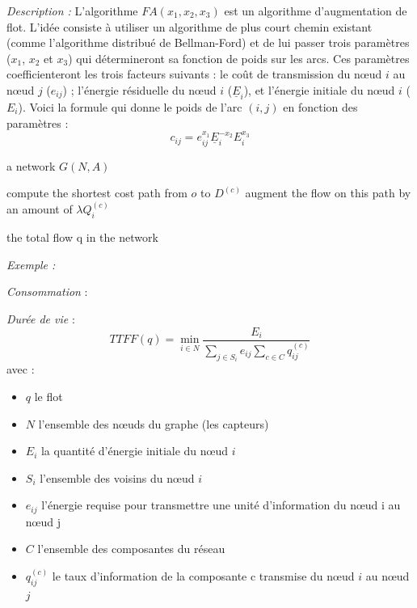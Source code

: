 \emph{Description :}
L'algorithme $FA(x_1, x_2, x_3)$ est un algorithme d'augmentation de flot. L'idée consiste à utiliser un algorithme de plus court chemin existant (comme l'algorithme distribué de Bellman-Ford) et de lui passer trois paramètres ($x_1$, $x_2$ et $x_3$) qui détermineront sa fonction de poids sur les arcs. Ces paramètres coefficienteront les trois facteurs suivants : le coût de transmission du nœud $i$ au nœud $j$ ($e_{ij}$) ; l'énergie résiduelle du nœud $i$ ($\underline{E}_i$), et l'énergie initiale du nœud $i$ ($E_i$). Voici la formule qui donne le poids de l'arc $(i,j)$ en fonction des paramètres :
\begin{displaymath}
c_{ij} = e_{ij}^{x_1} \underline{E}_i^{-x_2} E_i^{x_3}
\end{displaymath}

\begin{algorithm}[H]
\caption{$FA(x_1,x_2,x_3)$}
\label{algo_FA}
\begin{algorithmic}
\REQUIRE a network $ G(N,A) $

			\STATE compute the shortest cost path from $o$ to $D^{(c)}$
			\STATE augment the flow on this path by an amount of $\lambda Q_i^{(c)}$
		\ENDFOR
	\ENDFOR
\ENDWHILE

\RETURN the total flow q in the network
\end{algorithmic}
\end{algorithm}

\emph{Exemple :} %

\emph{Consommation} : 

\emph{Durée de vie} :  $$TTFF(q) = \min\limits_{i \in N}\frac{E_i}{\sum \limits_{j \in S_i} {e_{ij}} \sum \limits_{c \in C} {q_{ij}^{(c)}}}$$
avec :
\begin{itemize}
\item $q$ le flot
\item $N$ l'ensemble des nœuds du graphe (les capteurs)
\item $E_i$ la quantité d'énergie initiale du nœud $i$
\item $S_i$ l'ensemble des voisins du nœud $i$
\item $e_{ij}$ l'énergie requise pour transmettre une unité d'information du nœud i au nœud j
\item $C$ l'ensemble des composantes du réseau
\item $q_{ij}^{(c)}$ le taux d'information de la composante c transmise du nœud $i$ au nœud $j$
\end{itemize}



